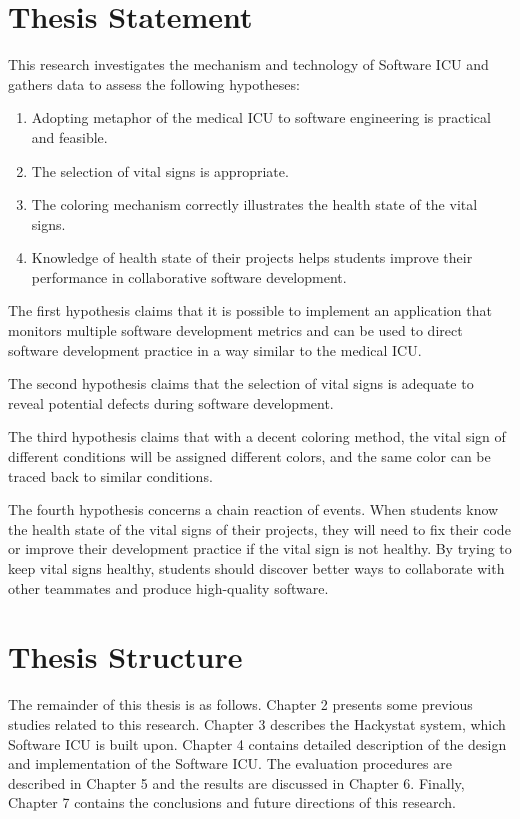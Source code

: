 \section{Thesis Statement}
This research investigates the mechanism and technology of Software ICU and gathers data to assess the following hypotheses: 
\begin{enumerate}
\item Adopting metaphor of the medical ICU to software engineering is practical and feasible.
\item The selection of vital signs is appropriate.
\item The coloring mechanism correctly illustrates the health state of the vital signs.
\item Knowledge of health state of their projects helps students improve their performance in collaborative software development.
\end{enumerate}
The first hypothesis claims that it is possible to implement an application that monitors multiple software development metrics and can be used to direct software development practice in a way similar to the medical ICU.

The second hypothesis claims that the selection of vital signs is adequate to reveal potential defects during software development.

The third hypothesis claims that with a decent coloring method, the vital sign of different conditions will be assigned different colors, and the same color can be traced back to similar conditions.

The fourth hypothesis concerns a chain reaction of events. When students know the health state of the vital signs of their projects, they will need to fix their code or improve their development practice if the vital sign is not healthy. By trying to keep vital signs healthy, students should discover better ways to collaborate with other teammates and produce high-quality software.

\section{Thesis Structure}
The remainder of this thesis is as follows. Chapter 2 presents some previous studies related to this research. Chapter 3 describes the Hackystat system, which Software ICU is built upon. Chapter 4 contains detailed description of the design and implementation of the Software ICU. The evaluation procedures are described in Chapter 5 and the results are discussed in Chapter 6. Finally, Chapter 7 contains the conclusions and future directions of this research. 



